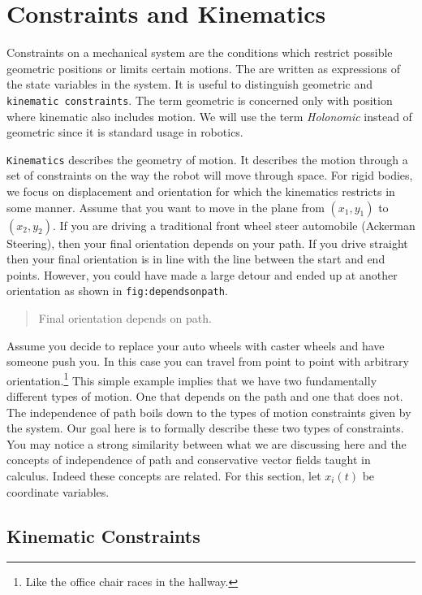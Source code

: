 \hypertarget{constraints-and-kinematics}{%
\section{Constraints and Kinematics}\label{constraints-and-kinematics}}

Constraints on a mechanical system are the conditions which restrict
possible geometric positions or limits certain motions. The are written
as expressions of the state variables in the system. It is useful to
distinguish geometric and \texttt{kinematic\ constraints}. The term
geometric is concerned only with position where kinematic also includes
motion. We will use the term \emph{Holonomic} instead of geometric since
it is standard usage in robotics.

\texttt{Kinematics} describes the geometry of motion. It describes the
motion through a set of constraints on the way the robot will move
through space. For rigid bodies, we focus on displacement and
orientation for which the kinematics restricts in some manner. Assume
that you want to move in the plane from \((x_1,y_1)\) to \((x_2,y_2)\).
If you are driving a traditional front wheel steer automobile (Ackerman
Steering), then your final orientation depends on your path. If you
drive straight then your final orientation is in line with the line
between the start and end points. However, you could have made a large
detour and ended up at another orientation as shown in
\texttt{fig:dependsonpath}.

\begin{quote}
Final orientation depends on path.
\end{quote}

Assume you decide to replace your auto wheels with caster wheels and
have someone push you. In this case you can travel from point to point
with arbitrary orientation.\footnote{Like the office chair races in the
  hallway.} This simple example implies that we have two fundamentally
different types of motion. One that depends on the path and one that
does not. The independence of path boils down to the types of motion
constraints given by the system. Our goal here is to formally describe
these two types of constraints. You may notice a strong similarity
between what we are discussing here and the concepts of independence of
path and conservative vector fields taught in calculus. Indeed these
concepts are related. For this section, let \(x_i(t)\) be coordinate
variables.

\hypertarget{kinematic-constraints}{%
\subsection{Kinematic Constraints}\label{kinematic-constraints}}

